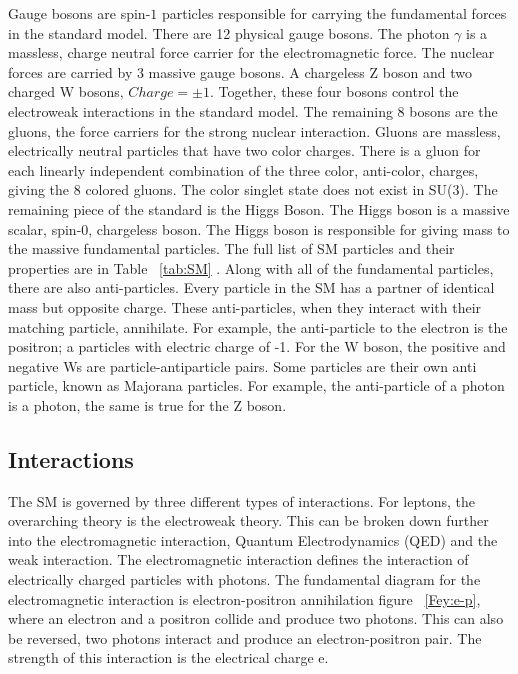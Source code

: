 \indent Gauge bosons are spin-${1}$ particles responsible for carrying the fundamental forces in the standard model. There are 12 physical gauge bosons. The photon ${\gamma}$ is a massless, charge neutral force carrier for the electromagnetic force. The nuclear forces are carried by 3 massive gauge bosons. A chargeless Z boson and two charged W bosons, ${Charge = \pm 1}$. Together, these four bosons control the electroweak interactions in the standard model. The remaining 8 bosons are the gluons, the force carriers for the strong nuclear interaction. Gluons are massless, electrically neutral particles that have two color charges. There is a gluon for each linearly independent combination of the three color, anti-color, charges, giving the 8 colored gluons. The color singlet state does not exist in SU(3).\newline
\indent The remaining piece of the standard is the Higgs Boson. The Higgs boson is a massive scalar, spin-${0}$, chargeless boson. The Higgs boson is responsible for giving mass to the massive fundamental particles. The full list of SM particles and their properties are in Table ~\ref{tab:SM}\newline
\indent. Along with all of the fundamental particles, there are also anti-particles. Every particle in the SM has a partner of identical mass but opposite charge. These anti-particles, when they interact with their matching particle, annihilate. For example, the anti-particle to the electron is the positron; a particles with electric charge of -1. For the W boson, the positive and negative Ws are particle-antiparticle pairs. Some particles are their own anti particle, known as Majorana particles. For example, the anti-particle of a photon is a photon, the same is true for the Z boson.\newline
\subsection{Interactions}
The SM is governed by three different types of interactions. For leptons, the overarching theory is the electroweak theory. This can be broken down further into the electromagnetic interaction, Quantum Electrodynamics (QED) and the weak interaction. The electromagnetic interaction defines the interaction of electrically charged particles with photons. The fundamental diagram for the electromagnetic interaction is electron-positron annihilation figure ~\ref{Fey:e-p}, where an electron and a positron collide and produce two photons. This can also be reversed, two photons interact and produce an electron-positron pair. The strength of this interaction is the electrical charge e. \newline

